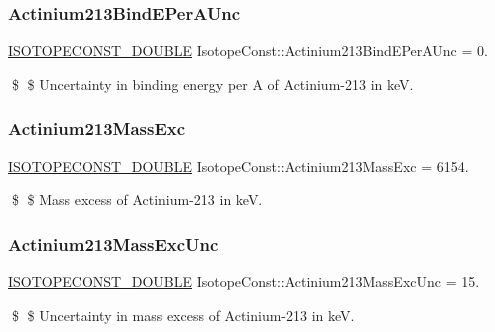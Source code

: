 \subsubsection{\texorpdfstring{Actinium213\+Bind\+E\+Per\+A\+Unc}{Actinium213BindEPerAUnc}}
{\footnotesize\ttfamily \mbox{\hyperlink{group___isotope_const-_macros_ga8f45a7272ce02c0b4c65c44636ed719a}{I\+S\+O\+T\+O\+P\+E\+C\+O\+N\+S\+T\+\_\+\+D\+O\+U\+B\+LE}} Isotope\+Const\+::\+Actinium213\+Bind\+E\+Per\+A\+Unc = 0.}

\$ \$ Uncertainty in binding energy per A of Actinium-\/213 in keV. \mbox{\label{group___isotope_const-_actinium-_ac213_gaab4d299e61d0c5b67d7e9254ac35aee6}} 
\subsubsection{\texorpdfstring{Actinium213\+Mass\+Exc}{Actinium213MassExc}}
{\footnotesize\ttfamily \mbox{\hyperlink{group___isotope_const-_macros_ga8f45a7272ce02c0b4c65c44636ed719a}{I\+S\+O\+T\+O\+P\+E\+C\+O\+N\+S\+T\+\_\+\+D\+O\+U\+B\+LE}} Isotope\+Const\+::\+Actinium213\+Mass\+Exc = 6154.}

\$ \$ Mass excess of Actinium-\/213 in keV. \mbox{\label{group___isotope_const-_actinium-_ac213_ga2824b19acf73c2d40b585d7ca3c032bf}} 
\subsubsection{\texorpdfstring{Actinium213\+Mass\+Exc\+Unc}{Actinium213MassExcUnc}}
{\footnotesize\ttfamily \mbox{\hyperlink{group___isotope_const-_macros_ga8f45a7272ce02c0b4c65c44636ed719a}{I\+S\+O\+T\+O\+P\+E\+C\+O\+N\+S\+T\+\_\+\+D\+O\+U\+B\+LE}} Isotope\+Const\+::\+Actinium213\+Mass\+Exc\+Unc = 15.}

\$ \$ Uncertainty in mass excess of Actinium-\/213 in keV. \mbox{\label{group___isotope_const-_actinium-_ac213_ga02fd942420e11bebef82544b565cc0cf}} 
